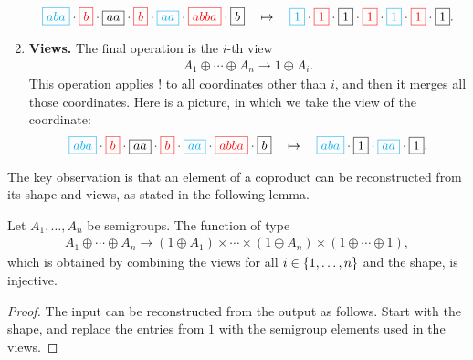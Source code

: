 \begin{enumerate}
\begin{align*}
            {\color{cyan}\boxed{aba}} \cdot 
            {\color{red}\boxed{b}} \cdot 
            \boxed{aa} \cdot 
            {\color{red}\boxed{b}} \cdot 
            {\color{cyan}\boxed{aa}} \cdot 
            {\color{red}\boxed{abba}} \cdot 
            \boxed{b}
            \quad \mapsto \quad  
            {\color{cyan}\boxed{1}} \cdot 
            {\color{red}\boxed{1}} \cdot 
            \boxed{1} \cdot 
            {\color{red}\boxed{1}} \cdot 
            {\color{cyan}\boxed{1}} \cdot 
            {\color{red}\boxed{1}} \cdot 
            \boxed{1}.
        \end{align*}
        \item \textbf{Views.} The final operation is the $i$-th view 
        \begin{align*}
        A_1 \oplus \cdots \oplus A_n \to 1 \oplus A_i.
        \end{align*}
        This operation applies $!$ to all coordinates other than $i$, and then it merges all those coordinates. Here is a picture, in which we take the view of the  coordinate:
        \begin{align*}
            {\color{cyan}\boxed{aba}} \cdot 
            {\color{red}\boxed{b}} \cdot 
            \boxed{aa} \cdot 
            {\color{red}\boxed{b}} \cdot 
            {\color{cyan}\boxed{aa}} \cdot 
            {\color{red}\boxed{abba}} \cdot 
            \boxed{b}
            \quad \mapsto \quad  
            {\color{cyan}\boxed{aba}} \cdot 
            {\boxed{1}} \cdot 
            {\color{cyan}\boxed{aa}} \cdot 
            \boxed{1}.
        \end{align*}
        
\end{enumerate}




The key observation is that an element of a coproduct can be reconstructed from its shape and views, as stated in the following lemma. 

\begin{lemma}
\label{lem:views} Let $A_1,\ldots,A_n$ be semigroups. The function of type
\begin{align*}
A_1 \oplus \cdots \oplus A_n \to (1 \oplus A_1) \times \cdots \times (1 \oplus A_n) \times (1 \oplus \cdots \oplus 1),
\end{align*}
which is obtained by combining the views for all $i \in \{1,\ldots,n\}$ and the shape, is injective. 
\end{lemma}
\begin{proof}
    The input can be reconstructed from the output as follows.
    Start with the shape, and replace the entries from $1$ with the semigroup elements used in the views.
\end{proof}


